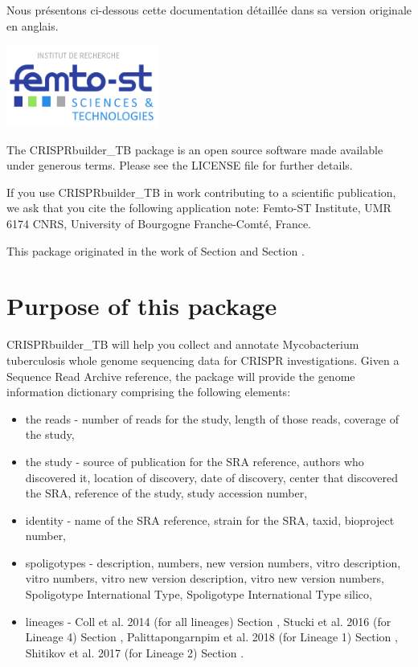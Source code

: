 \documentclass[twoside,a4paper,11pt,frenchb,openany]{report}
\begin{document}
Nous présentons ci-dessous cette documentation détaillée dans sa version originale en anglais.

\includegraphics[width=5cm]{femto.png}

The CRISPRbuilder\_TB package is an open source software made available
under generous terms. Please see the LICENSE file for further details.

If you use CRISPRbuilder\_TB in work contributing to a scientific
publication, we ask that you cite the following application note:
Femto-ST Institute, UMR 6174 CNRS, University of Bourgogne
Franche-Comté, France.

This package originated in the work of Section \cite{guyeux1} and
Section \cite{guyeux2}.



    \section*{Purpose of this package}\label{purpose-of-this-package}

    CRISPRbuilder\_TB will help you collect and annotate Mycobacterium
tuberculosis whole genome sequencing data for CRISPR investigations.
Given a Sequence Read Archive reference, the package will provide the
genome information dictionary comprising the following elements:

\begin{itemize}
\item
  the reads - number of reads for the study, length of those reads,
  coverage of the study,
\item
  the study - source of publication for the SRA reference, authors who
  discovered it, location of discovery, date of discovery, center that
  discovered the SRA, reference of the study, study accession number,
\item
  identity - name of the SRA reference, strain for the SRA, taxid,
  bioproject number,
\item
  spoligotypes - description, numbers, new version numbers, vitro
  description, vitro numbers, vitro new version description, vitro new
  version numbers, Spoligotype International Type, Spoligotype
  International Type silico,
\item
  lineages - Coll et al. 2014 (for all lineages) Section \cite{coll-preston},
  Stucki et al. 2016 (for Lineage 4) Section \cite{stucki-brites},
  Palittapongarnpim et al. 2018 (for Lineage 1) Section \cite{pali-ajaw},
  Shitikov et al. 2017 (for Lineage 2) Section \cite{shiti-kolchenko}.
\end{itemize}
\end{document}

